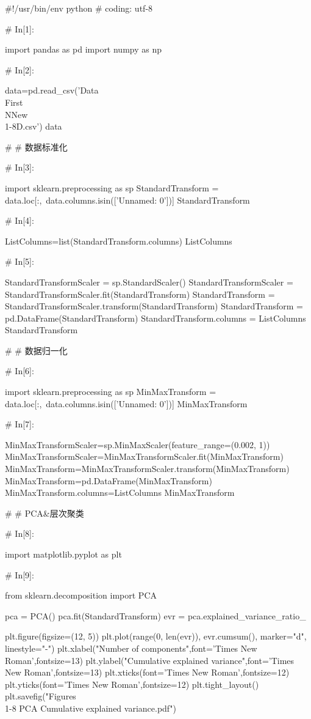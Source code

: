 \documentclass{MathorCupModeling}
\begin{document}
\begin{python}
#!/usr/bin/env python
# coding: utf-8

# In[1]:


import pandas as pd
import numpy as np


# In[2]:


data=pd.read_csv('Data\\First\\NNew\\1-8D.csv')
data


# # 数据标准化

# In[3]:


import sklearn.preprocessing as sp
StandardTransform = data.loc[:,~data.columns.isin(['Unnamed: 0'])]
StandardTransform


# In[4]:


ListColumns=list(StandardTransform.columns)
ListColumns


# In[5]:


StandardTransformScaler = sp.StandardScaler()
StandardTransformScaler = StandardTransformScaler.fit(StandardTransform)
StandardTransform = StandardTransformScaler.transform(StandardTransform)
StandardTransform = pd.DataFrame(StandardTransform)
StandardTransform.columns = ListColumns
StandardTransform


# # 数据归一化

# In[6]:


import sklearn.preprocessing as sp
MinMaxTransform = data.loc[:,~data.columns.isin(['Unnamed: 0'])]
MinMaxTransform


# In[7]:


MinMaxTransformScaler=sp.MinMaxScaler(feature_range=(0.002, 1))
MinMaxTransformScaler=MinMaxTransformScaler.fit(MinMaxTransform)
MinMaxTransform=MinMaxTransformScaler.transform(MinMaxTransform)
MinMaxTransform=pd.DataFrame(MinMaxTransform)
MinMaxTransform.columns=ListColumns
MinMaxTransform


# # PCA&层次聚类

# In[8]:


import matplotlib.pyplot as plt


# In[9]:


from sklearn.decomposition import PCA

pca = PCA()
pca.fit(StandardTransform)
evr = pca.explained_variance_ratio_

plt.figure(figsize=(12, 5))
plt.plot(range(0, len(evr)), evr.cumsum(), marker="d", linestyle="-")
plt.xlabel("Number of components",font='Times New Roman',fontsize=13)
plt.ylabel("Cumulative explained variance",font='Times New Roman',fontsize=13)
plt.xticks(font='Times New Roman',fontsize=12)
plt.yticks(font='Times New Roman',fontsize=12)
plt.tight_layout()
plt.savefig("Figures\\1-8 PCA Cumulative explained variance.pdf")



\end{python}
\end{document}
